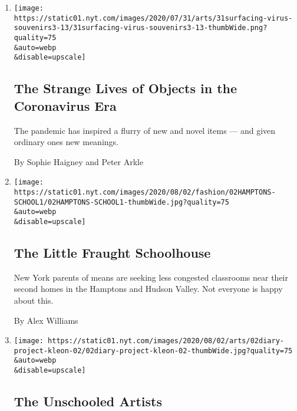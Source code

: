 \begin{enumerate}
\def\labelenumi{\arabic{enumi}.}
\item
  \href{/2020/08/01/arts/design/virus-design-objects.html}{}

  \texttt{[image: https://static01.nyt.com/images/2020/07/31/arts/31surfacing-virus-souvenirs3-13/31surfacing-virus-souvenirs3-13-thumbWide.png?quality=75\\\&auto=webp\\\&disable=upscale]}

  \hypertarget{the-strange-lives-of-objects-in-the-coronavirus-era}{%
  \subsection{The Strange Lives of Objects in the Coronavirus
  Era}\label{the-strange-lives-of-objects-in-the-coronavirus-era}}

  The pandemic has inspired a flurry of new and novel items --- and
  given ordinary ones new meanings.

  By Sophie Haigney and Peter Arkle
\item
  \href{/2020/08/01/style/wealthy-rich-parents-coronavirus-schools-hamptons.html}{}

  \texttt{[image: https://static01.nyt.com/images/2020/08/02/fashion/02HAMPTONS-SCHOOL1/02HAMPTONS-SCHOOL1-thumbWide.jpg?quality=75\\\&auto=webp\\\&disable=upscale]}

  \hypertarget{the-little-fraught-schoolhouse}{%
  \subsection{The Little Fraught
  Schoolhouse}\label{the-little-fraught-schoolhouse}}

  New York parents of means are seeking less congested classrooms near
  their second homes in the Hamptons and Hudson Valley. Not everyone is
  happy about this.

  By Alex Williams
\item
  \href{/2020/07/31/arts/quarantine-parenting-art.html}{}

  \texttt{[image: https://static01.nyt.com/images/2020/08/02/arts/02diary-project-kleon-02/02diary-project-kleon-02-thumbWide.jpg?quality=75\\\&auto=webp\\\&disable=upscale]}

  \hypertarget{the-unschooled-artists}{%
  \subsection{The Unschooled Artists}\label{the-unschooled-artists}}


\end{enumerate}
